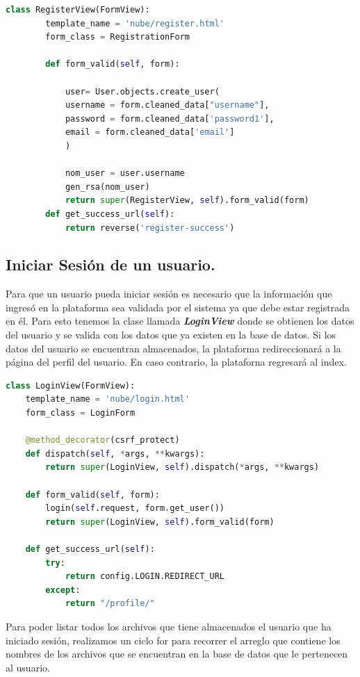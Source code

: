 \begin{lstlisting}[language=Python,frame=single, keywordstyle=\color{blue},breaklines=true]
	class RegisterView(FormView):
		template_name = 'nube/register.html'
		form_class = RegistrationForm

		def form_valid(self, form):

			user= User.objects.create_user(
			username = form.cleaned_data["username"],
			password = form.cleaned_data['password1'],
			email = form.cleaned_data['email']
			)

			nom_user = user.username
			gen_rsa(nom_user)
			return super(RegisterView, self).form_valid(form)
		def get_success_url(self):
			return reverse('register-success')
\end{lstlisting}

\subsection{Iniciar Sesión de un usuario. } 
Para que un usuario pueda iniciar sesión es necesario que la información que ingresó en la plataforma sea validada por el sistema ya que debe estar registrada en él.
Para esto tenemos la clase llamada \textbf{\textit{LoginView}} donde se obtienen los datos del usuario y se valida con los datos que ya existen en la base de datos. Si los datos del usuario se encuentran almacenados, la plataforma redireccionará a la página del perfil del usuario. En caso contrario, la plataforna regresará al index.

\begin{lstlisting}[language=Python,frame=single, keywordstyle=\color{blue},breaklines=true]
class LoginView(FormView):
	template_name = 'nube/login.html'
	form_class = LoginForm

	@method_decorator(csrf_protect)
	def dispatch(self, *args, **kwargs):
		return super(LoginView, self).dispatch(*args, **kwargs)

	def form_valid(self, form):
		login(self.request, form.get_user())
		return super(LoginView, self).form_valid(form)

	def get_success_url(self):
		try:
			return config.LOGIN.REDIRECT_URL
		except:
			return "/profile/"

\end{lstlisting}

Para poder listar todos los archivos que tiene almacenados el usuario que ha iniciado sesión, realizamos un ciclo for para recorrer el arreglo que contiene los nombres de los archivos que se encuentran en la base de datos que le pertenecen al usuario.

